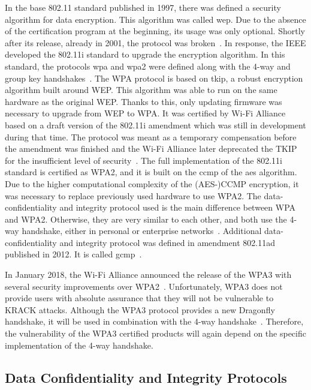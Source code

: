 In the base 802.11 standard published in 1997, there was defined a security algorithm for data encryption. This algorithm was called \gls{wep}. Due to the absence of the certification program at the beginning, its usage was only optional. Shortly after its release, already in 2001, the protocol was broken~\cite{Cam-Winget03, finalNailWEP, VA17, MEKHAZNIA_2015}. In response, the IEEE developed the 802.11i standard to upgrade the encryption algorithm. In this standard, the protocols \gls{wpa} and \gls{wpa2} were defined along with the 4-way and group key handshakes~\cite{ieee802.11i_2004}. The WPA protocol is based on \gls{tkip}, a robust encryption algorithm built around WEP. This algorithm was able to run on the same hardware as the original WEP. Thanks to this, only updating firmware was necessary to upgrade from WEP to WPA. It was certified by Wi-Fi Alliance based on a draft version of the 802.11i amendment which was still in development during that time. The protocol was meant as a temporary compensation before the amendment was finished and the Wi-Fi Alliance later deprecated the TKIP for the insufficient level of security~\cite{TKIP_deprecated}. The full implementation of the 802.11i standard is certified as WPA2, and it is built on the \gls{ccmp} of the \gls{aes} algorithm. Due to the higher computational complexity of the \mbox{(AES-)CCMP} encryption, it was necessary to replace previously used hardware to use WPA2. The data-confidentiality and integrity protocol used is the main difference between WPA and WPA2. Otherwise, they are very similar to each other, and both use the 4-way handshake, either in personal or enterprise networks~\cite{ieee802.11i_2004}. Additional data-confidentiality and integrity protocol was defined in amendment 802.11ad published in 2012. It is called \gls{gcmp}~\cite{IEEE802_11ad}.

In January 2018, the Wi-Fi Alliance announced the release of the WPA3 with several security improvements over WPA2~\cite{wpa3}. Unfortunately, WPA3 does not provide users with absolute assurance that they will not be vulnerable to KRACK attacks. Although the WPA3 protocol provides a new Dragonfly handshake, it will be used in combination with the 4-way handshake~\cite{vanhoef_2018_WPA3}. Therefore, the vulnerability of the WPA3 certified products will again depend on the specific implementation of the 4-way handshake. 

\subsection{Data Confidentiality and Integrity Protocols}

